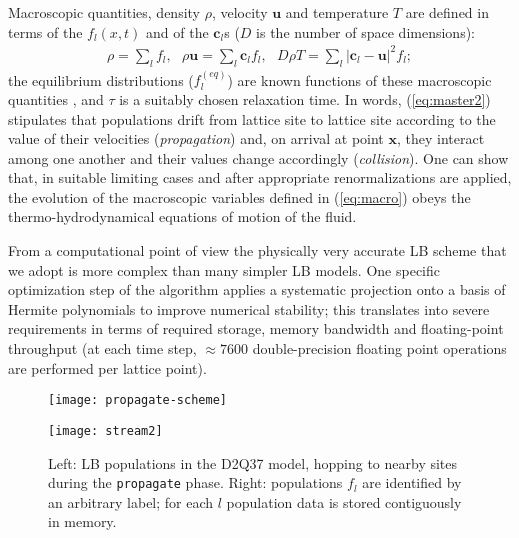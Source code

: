 \documentclass[times]{cpeauth}
\newcommand{\T}{T}
\begin{document}
Macroscopic quantities, density $\rho$, velocity $\bm u$  and temperature $T$
are defined in terms of the $f_l(x,t)$ and of the $\bm c_{l}$s ($D$ is the 
number of space dimensions):
%
\begin{eqnarray}
\rho = \sum_l f_l,~~~
\rho {\bm u} = \sum_l {\bm c}_l f_l, ~~~ 
D \rho \T = \sum_l \left|{\bm c}_l - {\bm u}\right|^2 f_l;
\label{eq:macro}
\end{eqnarray}
%
the equilibrium distributions (${f}_{l}^{(eq)}$) are known functions of
these macroscopic quantities \cite{sauro}, and $\tau$ is a suitably chosen relaxation time. 
In words, (\ref{eq:master2}) stipulates that populations drift from lattice
site to lattice site according to the value of their velocities 
({\em propagation}) and, on arrival at point ${\bm x}$, they interact among  one another and
their values change accordingly ({\em collision}). One can show that, in
suitable limiting cases and after appropriate renormalizations are applied, the
evolution of the macroscopic variables defined in (\ref{eq:macro}) obeys the
thermo-hydrodynamical equations of motion of the fluid.

From a computational point of view the physically very accurate LB scheme that we adopt  is
more complex than many simpler LB models. One specific optimization step of the algorithm applies a systematic projection onto a basis of Hermite polynomials to improve numerical stability; this translates into severe 
requirements in terms of required storage, memory bandwidth and floating-point throughput (at each time step, $\approx 7600$ 
double-precision floating point operations are performed per lattice point). 


%
\begin{figure}[t]
\centering
\begin{minipage}[h]{0.4\textwidth}
\texttt{[image: propagate-scheme]}
\end{minipage}
\hspace*{20mm}
\begin{minipage}[h]{0.4\textwidth}
\texttt{[image: stream2]}
\end{minipage}
\caption{Left: LB populations in the D2Q37 model, hopping to nearby 
sites during the {\tt propagate} phase.
%
Right: populations $f_l$ are identified by an arbitrary label; 
for each $l$ population data is stored contiguously in memory.}
\label{streamscheme}
\end{figure}
%
\end{document}
